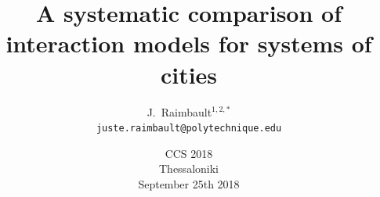 \documentclass[english,11pt]{beamer}
\begin{document}
\title{A systematic comparison of interaction models for systems of cities}

\author{J.~Raimbault$^{1,2,\ast}$\\
\texttt{juste.raimbault@polytechnique.edu}
}




\date{CCS 2018\\\smallskip
Thessaloniki\\\smallskip
September 25th 2018
}

\frame{\maketitle}



\end{document}

